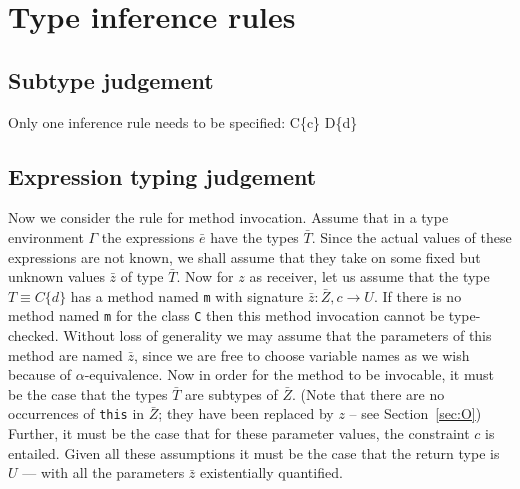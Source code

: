 \section{Type inference rules}
\subsection{Subtype judgement}

Only one inference rule needs to be specified:
{\Gamma \vdash C\{c\} \subtype D\{d\}}

\subsection{Expression typing judgement}

Now we consider the rule for method invocation. Assume that in a type
environment $\Gamma$ the expressions $\bar{e}$ have the types
$\bar{T}$. Since the actual values of these expressions are not known,
we shall assume that they take on some fixed but unknown values
$\bar{z}$ of type $\bar{T}$.  Now for $z$ as receiver, let us assume
that the type $T\equiv C\{d\}$ has a method named {\tt m} with
signature $\bar{z}: \bar{Z}, c \rightarrow U$.  If there is no method
named {\tt m} for the class {\tt C} then this method invocation cannot
be type-checked. Without loss of generality we may assume that the
parameters of this method are named $\bar{z}$, since we are free to
choose variable names as we wish because of $\alpha$-equivalence. Now
in order for the method to be invocable, it must be the case that the
types $\bar{T}$ are subtypes of $\bar{Z}$. (Note that there are no
occurrences of {\tt this} in $\bar{Z}$; they have been replaced by
$z$ -- see Section~\ref{sec:O}) Further, it must be the case that for these parameter values,
the constraint $c$ is entailed. Given all these assumptions it must be
the case that the return type is $U$ --- with all the parameters
$\bar{z}$ existentially quantified.

